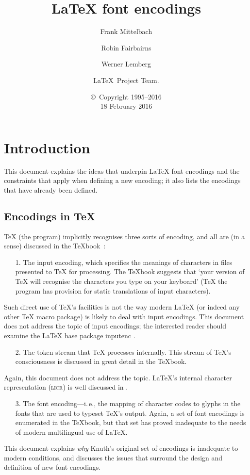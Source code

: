 \documentclass{ltxguide}[1994/11/20]
\title{\LaTeX{} font encodings}
\author{Frank Mittelbach \and Robin
   Fairbairns \and Werner Lemberg \and \LaTeX\ Project Team.}
\date{\copyright~Copyright 1995--2016 \\[5pt] 18 February 2016}
\providecommand{\Pkg}[1]{%
  \textsf{#1}}
\begin{document}
\maketitle

\tableofcontents

\section{Introduction}

This document explains the ideas that underpin \LaTeX{} font
encodings and the constraints that apply when defining a new encoding; it
also lists the encodings that have already been defined.

\subsection{Encodings in \TeX{}}

\TeX{} (the program) implicitly recognises three sorts of encoding,
and all are (in a sense) discussed in the \TeX{}book~\cite{A-W:DKn86}:
\begin{itemize}
\item[1.] The input encoding, which specifies the meanings of characters
  in files presented to \TeX{} for processing.  The \TeX{}book
  suggests that `your version of \TeX{} will recognise the characters
  you type on your keyboard' (\TeX{} the program has provision for
  static translations of input characters).
\end{itemize}
Such direct use of \TeX{}'s facilities is not the way modern
\LaTeX{} (or indeed any other \TeX{} macro package) is likely to deal
with input encodings.   This document does not address the topic of
input encodings; the interested reader should examine the \LaTeX{}
base package \Pkg{inputenc} \cite[sec.~7.5.2, p.357]{A-W:MG2004}.
\begin{itemize}
\item[2.] The token stream that \TeX{} processes internally.  This stream
  of \TeX{}'s consciousness is discussed in great detail in the
  \TeX{}book.
\end{itemize}
Again, this document does not address the topic.  \LaTeX's internal
character representation (\textsc{licr}) is well discussed in
\cite[sec.~7.11.2, p.442]{A-W:MG2004}.
\begin{itemize}
\item[3.] The font encoding---i.\,e., the mapping of character codes to
  glyphs in the fonts that are used to typeset \TeX{}'s output.
  Again, a set of font encodings is enumerated in the \TeX{}book, but
  that set has proved inadequate to the needs of modern multilingual
  use of \LaTeX.
\end{itemize}
This document explains \emph{why} Knuth's original set of encodings is
inadequate to modern conditions, and discusses the issues that
surround the design and definition of new font encodings.
\end{document}
